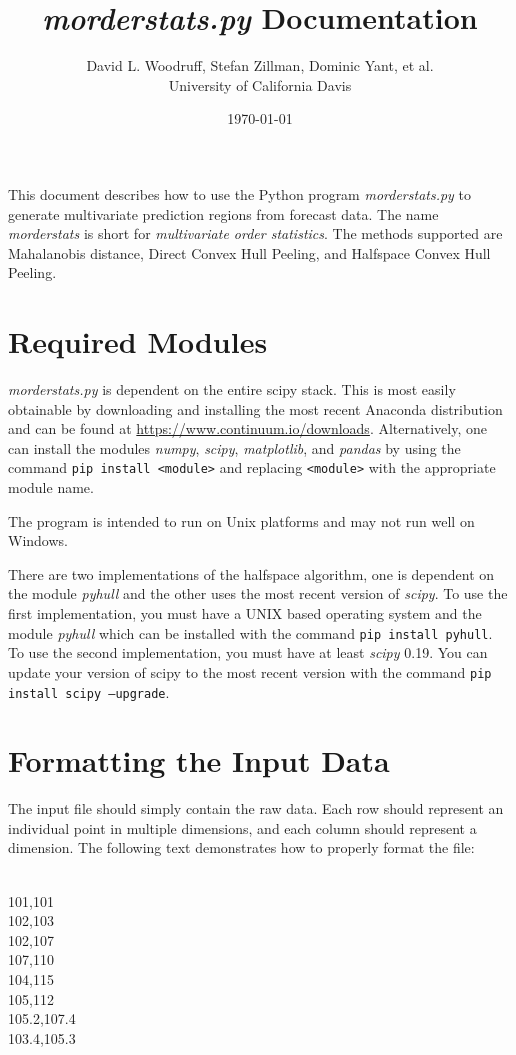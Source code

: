 \documentclass[11pt]{article}
\title{\textit{morderstats.py} Documentation}
\author{David L. Woodruff, Stefan Zillman, Dominic Yant, et al.\\
University of California Davis}
\date{\today}
\begin{document}
\maketitle

This document describes how to use the Python program
\textit{morderstats.py} to generate multivariate prediction regions
from forecast data. The name \textit{morderstats} is short for
\textit{multivariate order statistics}. The methods supported are
Mahalanobis distance, Direct Convex Hull Peeling, and Halfspace Convex
Hull Peeling.

\section{Required Modules}

\textit{morderstats.py} is dependent on the entire scipy stack. This is most easily obtainable by downloading and installing the most recent Anaconda distribution and can be found at  \url{https://www.continuum.io/downloads}. Alternatively, one can install the modules \textit{numpy}, \textit{scipy}, \textit{matplotlib}, and \textit{pandas} by using the command \texttt{pip install <module>} and replacing \texttt{<module>} with the appropriate module name. 

The program is intended to run on Unix platforms and may not run well on Windows.

There are two implementations of the halfspace algorithm, one is dependent on the module \textit{pyhull} and the other uses the most recent version of \textit{scipy}. To use the first implementation, you must have a UNIX based operating system and the module \textit{pyhull} which can be installed with the command \texttt{pip install pyhull}. To use the second implementation, you must have at least \textit{scipy} 0.19. You can update your version of scipy to the most recent version with the command \texttt{pip install scipy --upgrade}.

\section{Formatting the Input Data}

The input file should simply contain the raw data. Each row should represent an individual point in multiple dimensions, and each column should represent a dimension. The following text demonstrates how to properly format the file:

\begin{framed}
	\noindent
\\
101,101\\
102,103\\
102,107\\
107,110\\
104,115\\
105,112\\
105.2,107.4\\
103.4,105.3\\
\end{framed}
\end{document}
